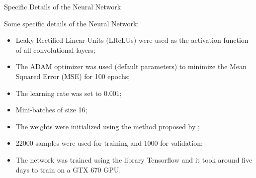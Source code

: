 \documentclass{beamer}
\begin{document}
\begin{frame}{Specific Details of the Neural Network}

Some specific details of the Neural Network:
\begin{itemize}
\item Leaky Rectified Linear Units (LReLUs) were used as the activation function of all convolutional layers;
\pause
\item The ADAM optimizer was used (default parameters) to minimize the Mean Squared Error (MSE) for 100 epochs;
\pause
\item The learning rate was set to 0.001;
\pause
\item Mini-batches of size 16;
\pause
\item The weights were initialized using the method proposed by \cite{glorot2010understanding};
\pause
\item 22000 samples were used for training and 1000 for validation;
\pause
\item The network was trained using the library Tensorflow and it took around five days to train on a GTX 670 GPU.
\end{itemize}

\end{frame}
\end{document}

